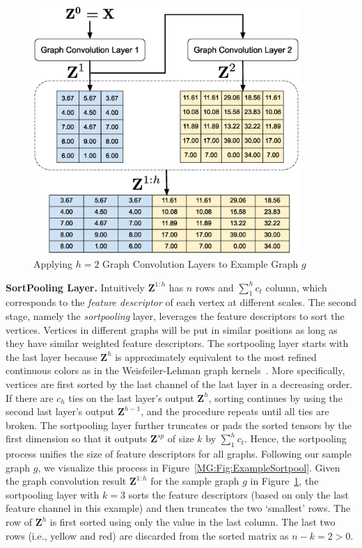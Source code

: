 \begin{figure}[htbp]
\centerline{\includegraphics[width=0.90\textwidth]{Magic/figures/ExampleGraphConvolution.eps}}
\caption{Applying $h=2$ Graph Convolution Layers to Example Graph $g$}
\label{MG:Fig:ExampleGraphConvolution}
\end{figure}

\textbf{SortPooling Layer.} Intuitively $\mathbf{Z}^{1:h}$ has $n$ rows and $\sum_{1}^{h}c_t$ column, which
corresponds to the \textit{feature descriptor} of each vertex at different scales.
The second stage, namely the \textit{sortpooling} layer,
leverages the feature descriptors to sort the vertices.
Vertices in different graphs will be put in similar positions as long as they have similar weighted feature descriptors.
The sortpooling layer starts with the last layer because $\mathbf{Z}^{h}$ is approximately
equivalent to the most refined continuous colors as in the Weisfeiler-Lehman graph kernels~\cite{WlGraphKernel}.
More specifically, vertices are first sorted by the last channel of the last layer in a decreasing order.
If there are $c_h$ ties on the last layer's output $\mathbf{Z}^{h}$,
sorting continues by using the second last layer's output $\mathbf{Z}^{h - 1}$, and the procedure repeats until all ties are broken.
The sortpooling layer further truncates or pads the sorted tensors by the first dimension so that it outputs $\mathbf{Z}^{sp}$ of size $k$ by $\sum_{1}^{h}c_t$.
Hence, the sortpooling process unifies the size of feature descriptors for all graphs.
Following our sample graph $g$, we visualize this process in Figure~\ref{MG:Fig:ExampleSortpool}.
Given the graph convolution result $\mathbf{Z}^{1:h}$ for the sample graph $g$ in Figure~\ref{MG:Fig:ExampleGraphConvolution},
the sortpooling layer with $k = 3$ sorts the feature descriptors (based on only the last feature channel in this example) and then truncates the two `smallest' rows.
The row of $\mathbf{Z}^{h}$ is first sorted using only the value in the last column.
The last two rows (i.e., yellow and red) are discarded from the sorted matrix as $n - k = 2 > 0$.

